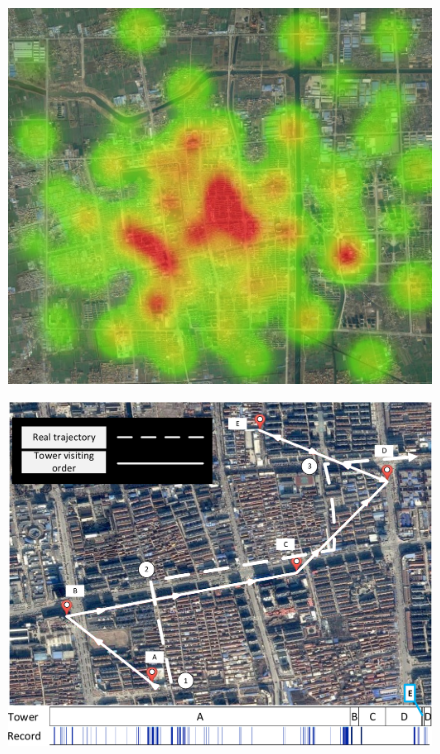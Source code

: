 \begin{figure}
\centering
\begin{minipage}{.5\textwidth}
  \centering
  {\includegraphics[width=0.915\linewidth]{./figures/hotmap.jpg}}
  \label{fig:city_sample}
\end{minipage}%
\begin{minipage}{.5\textwidth}
  \centering
  {\includegraphics[width=\linewidth]{./figures/typical_user.pdf}}
  \label{fig:typical_user}
\end{minipage}
\end{figure}


